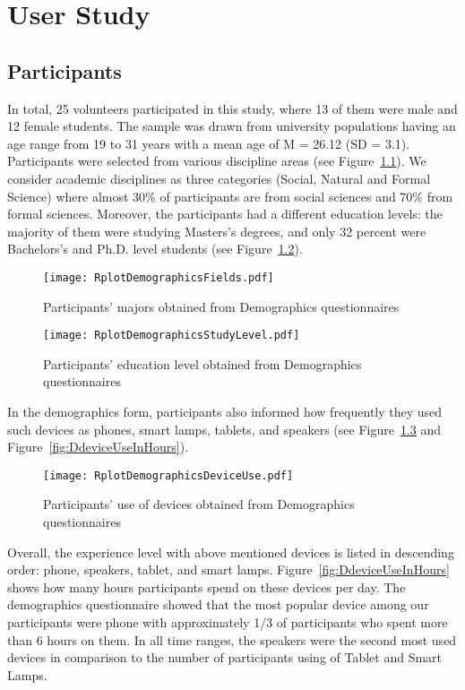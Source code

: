 \chapter{User Study}

\section{Participants}
In total, 25 volunteers participated in this study, where 13 of them were male and 12 female students. The sample was drawn from university populations having an age range from 19 to 31 years with a mean age of M = 26.12 (SD = 3.1). Participants were selected from various discipline areas (see Figure~\ref{fig:Dfields}). We consider academic disciplines as three categories (Social, Natural and Formal Science) where almost 30\% of participants are from social sciences and 70\% from formal sciences. Moreover, the participants had a different education levels: the majority of them were studying Masters’s degrees, and only 32 percent were Bachelors’s and Ph.D. level students (see Figure~\ref{fig:DstudyLevels}).

\begin{figure}[H]
  \centering
    \texttt{[image: RplotDemographicsFields.pdf]}
      \caption{Participants' majors obtained from Demographics questionnaires}
      \label{fig:Dfields}
\end{figure}

\begin{figure}[H]
  \centering
    \texttt{[image: RplotDemographicsStudyLevel.pdf]}
      \caption{Participants' education level obtained from Demographics questionnaires}
      \label{fig:DstudyLevels}
\end{figure}

In the demographics form, participants also informed how frequently they used such devices as phones, smart lamps, tablets, and speakers (see Figure~\ref{fig:DdeviceUse} and Figure~\ref{fig:DdeviceUseInHours}). 

\begin{figure}[H]
  \centering
    \texttt{[image: RplotDemographicsDeviceUse.pdf]}
      \caption{Participants' use of devices obtained from Demographics questionnaires}
      \label{fig:DdeviceUse}
\end{figure}

Overall, the experience level with above mentioned devices is listed in descending order: phone, speakers, tablet, and smart lamps. Figure~\ref{fig:DdeviceUseInHours} shows how many hours participants spend on these devices per day. The demographics questionnaire showed that the most popular device among our participants were phone with approximately 1/3 of participants who spent more than 6 hours on them. In all time ranges, the speakers were the second most used devices in comparison to the number of participants using of Tablet and Smart Lamps. 

